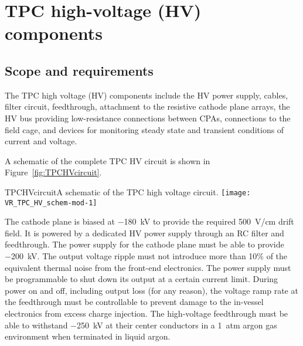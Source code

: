 




\section{TPC high-voltage (HV) components}

\subsection{Scope and requirements}

The TPC high voltage (HV) components include the HV power supply, cables,
filter circuit, feedthrough, attachment to the resistive cathode plane
arrays, the HV bus providing low-resistance connections between CPAs,
connections to the field cage, and devices for monitoring steady state
and transient conditions of current and voltage.

A schematic of the complete TPC HV circuit is shown in Figure~\ref{fig:TPCHVcircuit}.

\begin{cdrfigure}{TPCHVcircuit}{A schematic of the TPC high voltage circuit.}
  \texttt{[image: VR\_TPC\_HV\_schem-mod-1]}
\end{cdrfigure}

The cathode plane is biased at \SI{-180}{kV} to provide the
required \SI{500}{V/cm} drift field.  It is 
powered by a dedicated HV power supply through an RC filter and
feedthrough.  The power supply for the cathode plane must be able
to provide \SI{-200}{kV}.  The output voltage
ripple must not introduce more than 10\% 
of the equivalent thermal
noise from the front-end electronics. The power supply must be
programmable to shut down its output at a certain current
limit. During power on and off, including output loss (for any
reason), the voltage ramp rate at the feedthrough must be controllable
to prevent damage to the in-vessel electronics from excess charge
injection. The high-voltage feedthrough must be able to withstand \SI{-250}{kV}
at their center conductors in a \SI{1}{atm} argon gas environment when
terminated in liquid argon.


